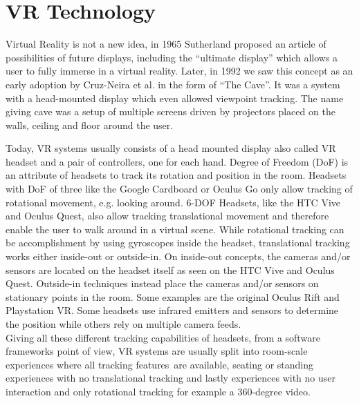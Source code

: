 


\section{VR Technology}

Virtual Reality is not a new idea, in 1965 Sutherland \cite{Sutherland65theultimate} proposed an article of possibilities of future displays, including the “ultimate display” which allows a user to fully immerse in a virtual reality. Later, in 1992 we saw this concept as an early adoption by Cruz-Neira et al. \cite{cruz-neira_cave_1992} in the form of “The Cave”. It was a system with a head-mounted display which even allowed viewpoint tracking. The name giving cave was a setup of multiple screens driven by projectors placed on the walls, ceiling and floor around the user.

Today, VR systems usually consists of a head mounted display also called VR headset and a pair of controllers, one for each hand. 
Degree of Freedom (DoF) is an attribute of headsets to track its rotation and position in the room. Headsets with DoF of three like the Google Cardboard or Oculus Go only allow tracking of rotational movement, e.g. looking around. 6-DOF Headsets, like the HTC Vive and Oculus Quest, also allow tracking translational movement and therefore enable the user to walk around in a virtual scene. 
While rotational tracking can be accomplishment by using gyroscopes inside the headset, translational tracking works either inside-out or outside-in. On inside-out concepts, the cameras and/or sensors are located on the headset itself as seen on the HTC Vive and Oculus Quest. Outside-in techniques instead place the cameras and/or sensors on stationary points in the room. Some examples are the original Oculus Rift and Playstation VR.
Some headsets use infrared emitters and sensors to determine the position while others rely on multiple camera feeds.\\
Giving all these different tracking capabilities of headsets, from a software frameworks point of view, VR systems are usually split into room-scale experiences where all tracking features are available, seating or standing experiences with no translational tracking and lastly experiences with no user interaction and only rotational tracking for example a 360-degree video.